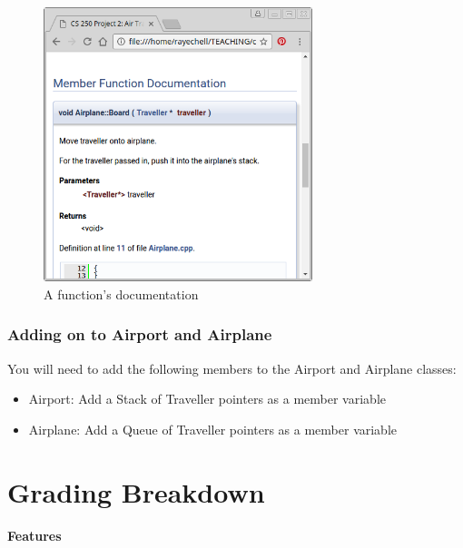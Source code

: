 \documentclass[a4paper,12pt,oneside]{book}
\begin{document}
    \begin{figure}[h]
        \center
        \includegraphics[height=8cm]{images/project2-functions.png}
        \caption{A function's documentation}
    \end{figure}
    
    \subsection{Adding on to Airport and Airplane}

    You will need to add the following members to the Airport and Airplane classes:
    
    \begin{itemize}
        \item Airport: Add a Stack of Traveller pointers as a member variable
        \item Airplane: Add a Queue of Traveller pointers as a member variable
    \end{itemize}
    
    \chapter*{Grading Breakdown}

    \textbf{Features}
    
\end{document}
